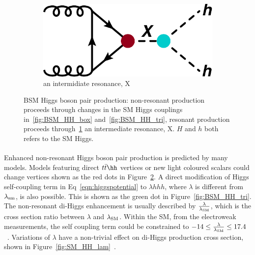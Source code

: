 \begin{figure}[h!]
\begin{subfigure}[b]{0.3\textwidth}
        \includegraphics[width=\textwidth]{figures/theory/BSM_HH_X}
        \caption{an intermidiate resonance, X}
        \label{fig:BSM_HH_X}
    \end{subfigure}
\caption{BSM Higgs boson pair production: non-resonant production proceeds through changes in the SM Higgs couplings in~\ref{fig:BSM_HH_box} and~\ref{fig:BSM_HH_tri}, resonant production proceeds through~\ref{fig:BSM_HH_X} an intermediate resonance, X. $H$ and $h$ both refers to the SM Higgs.}
\label{fig:BSM_HH}
\end{figure}

\paragraph{}
Enhanced non-resonant Higgs boson pair production is predicted by many models. Models featuring direct $t\bar{t}\hh$ vertices \cite{Grober:2010yv, Contino:2012xk} or new light coloured scalars \cite{PhysRevD.86.095023} could change vertices shown as the red dots in Figure~\ref{fig:BSM_HH}. A direct modification of Higgs self-coupling term in Eq~\ref{eqn:higgspotential} to $\lambda hhh$, where $\lambda$ is different from $\lambda_{\rm sm}$, is also possible. This is shown as the green dot in Figure~\ref{fig:BSM_HH_tri}. The non-resonant di-Higgs enhancement is usually described by $\frac{\rm \lambda}{\rm \lambda_{\rm SM}}$, which is the cross section ratio between $\lambda$ and $\lambda_{\rm SM}$. Within the SM, from the electroweak measurements, the self coupling term could be constrained to $-14 \leq \frac{\rm \lambda}{\rm \lambda_{\rm SM}} \leq 17.4$~\cite{Kribs:2017znd}. Variations of $\lambda$ have a non-trivial effect on di-Higgs production cross section, shown in Figure~\ref{fig:SM_HH_lam}~\cite{Frederix:2014hta}.

